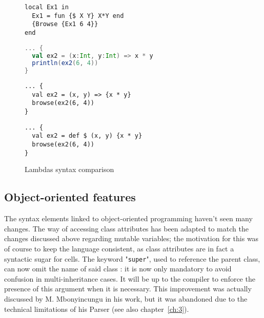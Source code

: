 \begin{figure}
    \noindent\begin{minipage}{.49\textwidth}
                 \begin{lstlisting}[title={Oz},language=oz]
local Ex1 in
  Ex1 = fun {$ X Y} X*Y end
  {Browse {Ex1 6 4}}
end
                 \end{lstlisting}
    \end{minipage}
    \hfill
    \noindent\begin{minipage}{.49\textwidth}
                 \begin{lstlisting}[title={Scala/Ozma},language=scala]
... {
  val ex2 = (x:Int, y:Int) => x * y
  println(ex2(6, 4))
}
                 \end{lstlisting}
    \end{minipage}
    \noindent\begin{minipage}{.49\textwidth}
                 \begin{lstlisting}[title={NewOz 2020},language=newoz]
... {
  val ex2 = (x, y) => {x * y}
  browse(ex2(6, 4))
}
                 \end{lstlisting}
    \end{minipage}
    \hfill
    \noindent\begin{minipage}{.49\textwidth}
                 \begin{lstlisting}[title={NewOz 2021},language=newoz]
... {
  val ex2 = def $ (x, y) {x * y}
  browse(ex2(6, 4))
}
                 \end{lstlisting}
    \end{minipage}
\caption{Lambdas syntax comparison}
\label{fig:code-comp-lambda}
\end{figure}

\subsection{Object-oriented features}
The syntax elements linked to object-oriented programming haven't seen many changes.
The way of accessing class attributes has been adapted to match the changes discussed above regarding mutable variables;
the motivation for this was of course to keep the language consistent, as class attributes are in fact a syntactic sugar for cells.
The keyword "\texttt{super}", used to reference the parent class, can now omit the name of said class : it is now only mandatory to avoid confusion in multi-inheritance cases.
It will be up to the compiler to enforce the presence of this argument when it is necessary.
This improvement was actually discussed by M. Mbonyincungu in his work, but it was abandoned due to the technical limitations of his Parser (see also chapter~\ref{ch:3}).\newline

